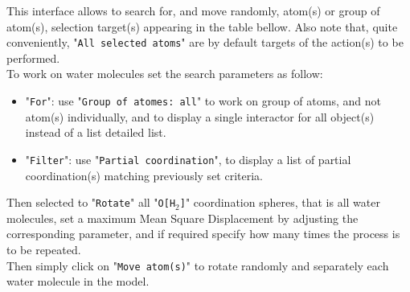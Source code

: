 This interface allows to search for, and move randomly, atom(s) or group of atom(s), selection target(s) appearing in the table bellow. 
Also note that, quite conveniently, "\texttt{All~selected~atoms}" are by default targets of the action(s) to be performed. \\
To work on water molecules set the search parameters as follow:
\begin{itemize}
\item "\texttt{For}": use "\texttt{Group~of~atomes:~all}" to work on group of atoms, and not atom(s) individually, and to display a single interactor for all object(s) instead of a list detailed list. 
\item "\texttt{Filter}": use "\texttt{Partial~coordination}", to display a list of partial coordination(s) matching previously set criteria. 
\end{itemize}
Then selected to "\texttt{Rotate}" all "\texttt{O[H$_2$]}" coordination spheres, that is all water molecules, set a maximum Mean Square Displacement by adjusting the corresponding parameter, and if required specify how many times the process is to be repeated. \\
Then simply click on "\texttt{Move atom(s)}" to rotate randomly and separately each water molecule in the model.\\[0.5cm]


